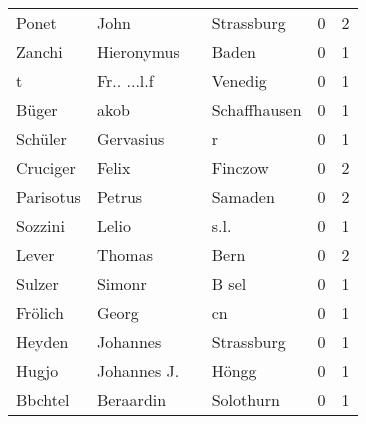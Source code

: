 \begin{center}
\begin{tiny}
\begin{longtabu}{llllrr}
                    Ponet &                               John &             &                                  Strassburg &          0 &         2 \\
                   Zanchi &                         Hieronymus &             &                                       Baden &          0 &         1 \\
                        t &                        Fr.. ...l.f &             &                                     Venedig &          0 &         1 \\
                    Büger &                               akob &             &                                Schaffhausen &          0 &         1 \\
                  Schüler &                          Gervasius &             &                                           r &          0 &         1 \\
                 Cruciger &                              Felix &             &                                     Finczow &          0 &         2 \\
                Parisotus &                             Petrus &             &                                     Samaden &          0 &         2 \\
                  Sozzini &                              Lelio &             &                                        s.l. &          0 &         1 \\
                    Lever &                             Thomas &             &                                        Bern &          0 &         2 \\
                   Sulzer &                             Simonr &             &                                       B sel &          0 &         1 \\
                  Frölich &                              Georg &             &                                          cn &          0 &         1 \\
                   Heyden &                           Johannes &             &                                  Strassburg &          0 &         1 \\
                    Hugjo &                        Johannes J. &             &                                       Höngg &          0 &         1 \\
                  Bbchtel &                          Beraardin &             &                                   Solothurn &          0 &         1 \\

\end{longtabu}
\end{tiny}
\end{center}
